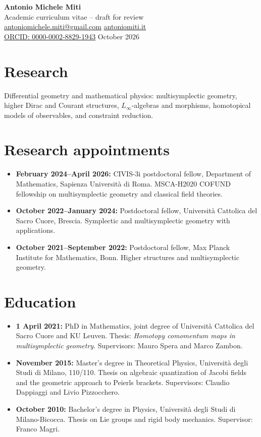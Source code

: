 \documentclass[11pt,a4paper]{article}
\newcommand{\AI}[1]{{\color{red}#1}}
\begin{document}
\begin{center}
{\LARGE\bfseries Antonio Michele Miti}\\[0.2em]
{\large Academic curriculum vitae -- draft for review}\\[0.3em]
\href{mailto:antoniomichele.miti@gmail.com}{antoniomichele.miti@gmail.com}\quad
\href{https://www.antoniomiti.it/}{antoniomiti.it}\\
\href{https://orcid.org/0000-0002-8829-1943}{ORCID: 0000-0002-8829-1943} October 2026
\end{center}
\section*{Research}
\AI{Differential geometry and mathematical physics: multisymplectic geometry, higher Dirac and Courant structures, $L_\infty$-algebras and morphisms, homotopical models of observables, and constraint reduction.}
\section*{Research appointments}
\begin{itemize}
\item \textbf{February 2024--April 2026:} CIVIS-3i postdoctoral fellow, Department of Mathematics, Sapienza Universit\`a di Roma. MSCA-H2020 COFUND fellowship on multisymplectic geometry and classical field theories.
\item \textbf{October 2022--January 2024:} Postdoctoral fellow, Universit\`a Cattolica del Sacro Cuore, Brescia. Symplectic and multisymplectic geometry with applications.
\item \textbf{October 2021--September 2022:} Postdoctoral fellow, Max Planck Institute for Mathematics, Bonn. Higher structures and multisymplectic geometry.
\end{itemize}
\section*{Education}
\begin{itemize}
\item \textbf{1 April 2021:} PhD in Mathematics, joint degree of Universit\`a Cattolica del Sacro Cuore and KU Leuven. Thesis: \emph{Homotopy comomentum maps in multisymplectic geometry}. Supervisors: Mauro Spera and Marco Zambon.
\item \textbf{November 2015:} Master's degree in Theoretical Physics, Universit\`a degli Studi di Milano, 110/110. Thesis on algebraic quantization of Jacobi fields and the geometric approach to Peierls brackets. Supervisors: Claudio Dappiaggi and Livio Pizzocchero.
\item \textbf{October 2010:} Bachelor's degree in Physics, Universit\`a degli Studi di Milano-Bicocca. Thesis on Lie groups and rigid body mechanics. Supervisor: Franco Magri.
\end{itemize}
\end{document}
